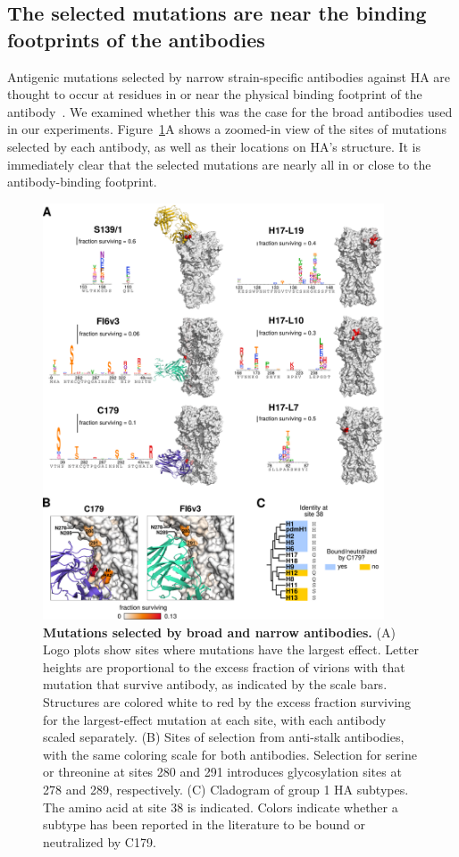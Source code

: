 \documentclass[11pt]{article}
\begin{document}
\subsection*{The selected mutations are near the binding footprints of the antibodies}
Antigenic mutations selected by narrow strain-specific antibodies against HA are thought to occur at residues in or near the physical binding footprint of the antibody~\citep{yewdell1979antigenic,webster1980determination,caton1982antigenic}.
We examined whether this was the case for the broad antibodies used in our experiments.
Figure~\ref{fig:structures}A shows a zoomed-in view of the sites of mutations selected by each antibody, as well as their locations on HA's structure. 
It is immediately clear that the selected mutations are nearly all in or close to the antibody-binding footprint.

\begin{figure}[h!]
\centerline{\includegraphics[width=0.9\textwidth]{figs/logoplots_pymol/logoplots_pymol.pdf}}
\caption{
\label{fig:structures}
{\bf Mutations selected by broad and narrow antibodies.}
(A) Logo plots show sites where mutations have the largest effect.
Letter heights are proportional to the excess fraction of virions with that mutation that survive antibody, as indicated by the scale bars.
Structures are colored white to red by the excess fraction surviving for the largest-effect mutation at each site, with each antibody scaled separately.  
(B) Sites of selection from anti-stalk antibodies, with the same coloring scale for both antibodies. Selection for serine or threonine at sites 280 and 291 introduces glycosylation sites at 278 and 289, respectively.
(C) Cladogram of group 1 HA subtypes.
The amino acid at site 38 is indicated. 
Colors indicate whether a subtype has been reported in the literature to be bound or neutralized by C179.  
}
\end{figure}
\end{document}
